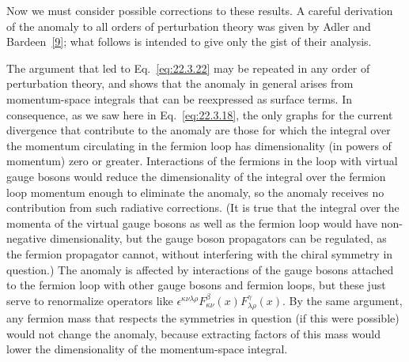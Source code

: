 Now we must consider possible corrections to these results. A careful
derivation of the anomaly to all orders of perturbation theory was given by
Adler and Bardeen~\hyperref[ch22-ref-9]{[9]}; what follows is intended to
give only the gist of their analysis.

The argument that led to Eq.~\eqref{eq:22.3.22} may be repeated in any
order of perturbation theory, and shows that the anomaly in general arises
from momentum-space integrals that can be reexpressed as surface terms. In
consequence, as we saw here in Eq.~\eqref{eq:22.3.18}, the only graphs for
the current divergence that contribute to the anomaly are those for which
the integral over the momentum circulating in the fermion loop has
dimensionality (in powers of momentum) zero or greater. Interactions of the
fermions in the loop with virtual gauge bosons would reduce the
dimensionality of the integral over the fermion loop momentum enough to
eliminate the anomaly, so the anomaly receives no contribution from such
radiative corrections. (It is true that the integral over the momenta of
the virtual gauge bosons as well as the fermion loop would have
non-negative dimensionality, but the gauge boson propagators can be
regulated, as the fermion propagator cannot, without interfering with the
chiral symmetry in question.) The anomaly is affected by interactions of
the gauge bosons attached to the fermion loop with other gauge bosons and
fermion loops, but these just serve to renormalize operators like
$\epsilon^{\kappa\nu\lambda\rho}F_{\kappa\nu}^{\beta}(x)
F_{\lambda\rho}^{\gamma}(x)$. By the same argument, any fermion mass that
respects the symmetries in question (if this were possible) would not
change the anomaly, because extracting factors of this mass would lower
the dimensionality of the momentum-space integral.

